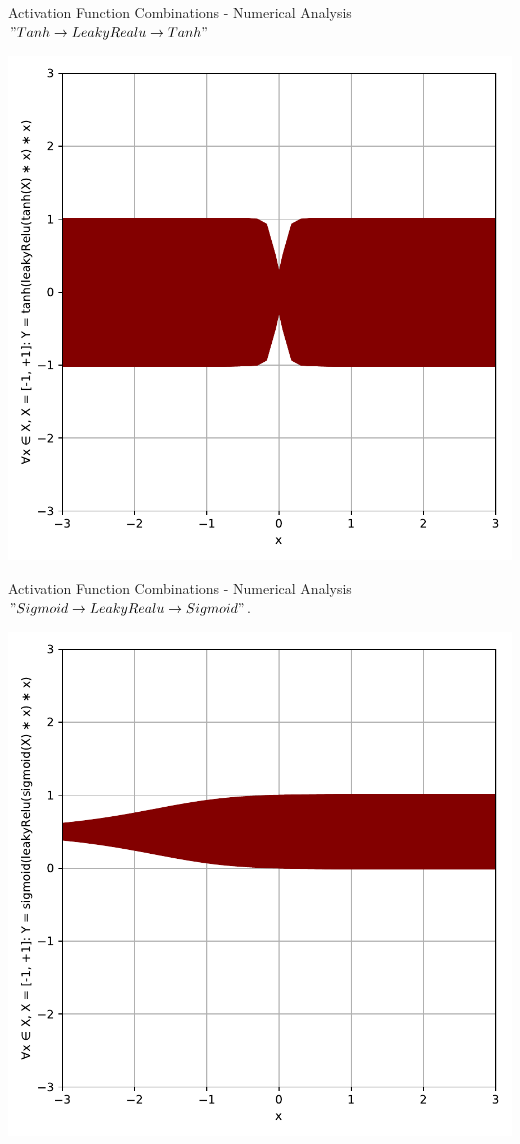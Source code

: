 \documentclass{beamer}
\begin{document}
		\begin{frame}{Activation Function Combinations - Numerical Analysis}
			$" Tanh \rightarrow LeakyRealu \rightarrow Tanh "$
			\begin{center}
				\includegraphics[height=0.88\textheight]{tanh_leakyRelu_tanh}
			\end{center}
		\end{frame}
		\begin{frame}{Activation Function Combinations - Numerical Analysis}
			$" Sigmoid \rightarrow LeakyRealu \rightarrow Sigmoid "$.
			\begin{center}
				\includegraphics[height=0.88\textheight]{sigmoid_leakyRelu_sigmoid}
			\end{center}
		\end{frame}
\end{document}
